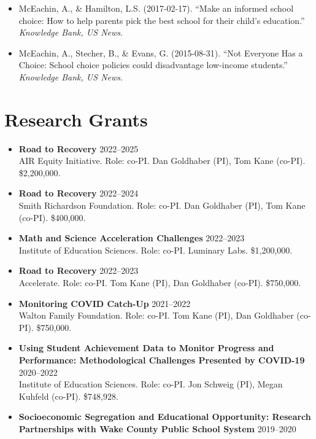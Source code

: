 \documentclass[11pt, letterpaper]{article}
\begin{document}
\begin{itemize}
  \item McEachin, A., \& Hamilton, L.S. (2017-02-17).
  ``Make an informed school choice: How to help parents pick the best school for their child's education.'' \textit{Knowledge Bank, US News}.

  \item McEachin, A., Stecher, B., \& Evans, G. (2015-08-31).
  ``Not Everyone Has a Choice: School choice policies could disadvantage low-income students.'' \textit{Knowledge Bank, US News}.

\end{itemize}

\section{Research Grants}
\begin{itemize}
  \item \textbf{Road to Recovery} \hfill 2022--2025 \\
  AIR Equity Initiative. Role: co-PI.
Dan Goldhaber (PI), Tom Kane (co-PI). \$2,200,000.
  \item \textbf{Road to Recovery} \hfill 2022--2024 \\
  Smith Richardson Foundation. Role: co-PI.
Dan Goldhaber (PI), Tom Kane (co-PI). \$400,000.
  \item \textbf{Math and Science Acceleration Challenges} \hfill 2022--2023 \\
  Institute of Education Sciences. Role: co-PI.
Luminary Labs. \$1,200,000.
  \item \textbf{Road to Recovery} \hfill 2022--2023 \\
  Accelerate. Role: co-PI.
Tom Kane (PI), Dan Goldhaber (co-PI). \$750,000.
  \item \textbf{Monitoring COVID Catch-Up} \hfill 2021--2022 \\
  Walton Family Foundation. Role: co-PI.
Tom Kane (PI), Dan Goldhaber (co-PI). \$750,000.
  \item \textbf{Using Student Achievement Data to Monitor Progress and Performance: Methodological Challenges Presented by COVID-19} \hfill 2020--2022 \\
  Institute of Education Sciences. Role: co-PI.
Jon Schweig (PI), Megan Kuhfeld (co-PI). \$748,928.
  \item \textbf{Socioeconomic Segregation and Educational Opportunity: Research Partnerships with Wake County Public School System} \hfill 2019--2020 \\

\end{itemize}
\end{document}

